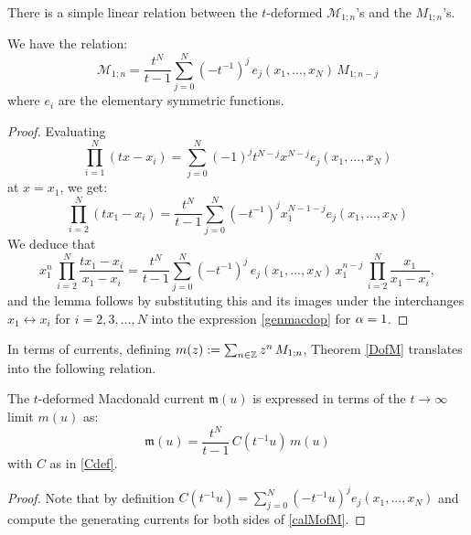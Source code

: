 There is a simple linear relation between the $t$-deformed ${\mathcal M}_{1;n}$'s and the $M_{1;n}$'s.
\begin{thm}\label{DofM}
We have the relation:
\begin{equation}\label{calMofM}
{\mathcal M}_{1;n}=\frac{t^{N}}{t-1} \sum_{j=0}^{N}(-t^{-1})^j 
\,  e_j(x_1,...,x_{N})\, M_{1;n-j}
\end{equation}
where $e_i$ are the elementary symmetric functions.
\end{thm}
\begin{proof}
Evaluating
\begin{equation}\label{evaone}
\prod_{i=1}^{N} (t x-x_i)=\sum_{j=0}^{N} (-1)^j t^{N-j} x^{N-j}  e_j(x_1,...,x_{N})
\end{equation}
at $x=x_1$, we get:
\begin{equation}\label{evatwo}
\prod_{i=2}^{N} (t x_1-x_i)=\frac{t^{N}}{t-1} \sum_{j=0}^{N}(-t^{-1})^j 
x_1^{N-1-j}  e_j(x_1,...,x_{N})
\end{equation}
%
We deduce that
\begin{equation}
x_1^n\,\prod_{i=2}^{N}  \frac{t x_1-x_i}{x_1-x_i}=\frac{t^{N}}{t-1} \sum_{j=0}^{N}(-t^{-1})^j \,e_j(x_1,...,x_{N})\,
x_1^{n-j} \,\prod_{i=2}^{N} \frac{x_1}{x_1-x_i} ,
\end{equation}
and the lemma follows by substituting this and its images under the interchanges $x_1 \leftrightarrow x_i$
for $i=2,3,...,N$ into the expression \eqref{genmacdop} for ${\alpha}=1$.
\end{proof}

In terms of currents, defining $m(z):=\sum_{n\in {\mathbb Z}} z^n\, M_{1;n}$, 
Theorem \ref{DofM} translates into the following relation.

\begin{cor}
The $t$-deformed Macdonald current ${\mathfrak m}(u)$ is expressed in terms of the $t\to\infty$ limit
$m(u)$ as:
\begin{equation}
{\mathfrak m}(u)=\frac{t^{N}}{t-1}\, C(t^{-1}u)\, m(u)
\end{equation}
with $C$ as in \eqref{Cdef}.
\end{cor}
\begin{proof}
Note that by definition $C(t^{-1} u)=\sum_{j=0}^N (-t^{-1} u)^j e_j(x_1,...,x_N)$ and compute
the generating currents for both sides of \eqref{calMofM}.
\end{proof}

